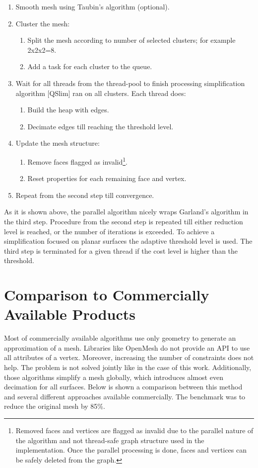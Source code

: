 \begin{enumerate}
\item Smooth mesh using Taubin's algorithm (optional).
\item Cluster the mesh:
\begin{enumerate}
\item Split the mesh according to number of selected clusters; for example 2x2x2=8.
\item Add a task for each cluster to the queue.
\end{enumerate}
\item Wait for all threads from the thread-pool to finish processing simplification algorithm [QSlim] ran on all clusters. Each thread does:
\begin{enumerate}
\item Build the heap with edges.
\item Decimate edges till reaching the threshold level.
\end{enumerate}
\item Update the mesh structure:
\begin{enumerate}
\item Remove faces flagged as invalid\footnote{Removed faces and vertices are flagged as invalid due to the parallel nature of the algorithm and not thread-safe graph structure used in the implementation. Once the parallel processing is done, faces and vertices can be safely deleted from the graph.}.
\item Reset properties for each remaining face and vertex.
\end{enumerate}
\item Repeat from the second step till convergence.
\end{enumerate}

As it is shown above, the parallel algorithm nicely wraps Garland's algorithm in the third step. Procedure from the second step is repeated till either reduction level is reached, or the number of iterations is exceeded. To achieve a simplification focused on planar surfaces the adaptive threshold level is used. The third step is terminated for a given thread if the cost level is higher than the threshold.

\newpage
\section{Comparison to Commercially Available Products}

Most of commercially available algorithms use only geometry to generate an approximation of a mesh. Libraries like OpenMesh do not provide an API to use all attributes of a vertex. Moreover, increasing the number of constraints does not help. The problem is not solved jointly like in the case of this work. Additionally, those algorithms simplify a mesh globally, which introduces almost even decimation for all surfaces. Below is shown a comparison between this method and several different approaches available commercially. The benchmark was to reduce the original mesh by 85\%.

